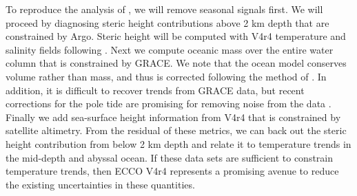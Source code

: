 \documentclass[authoryear,round,12pt]{article}
\begin{document}
To reproduce the analysis of \citet{Llovel-Willis-2014:Deep}, we will remove seasonal signals first. 
We will proceed by diagnosing steric height contributions above 2 km depth that are constrained by Argo. Steric height will be computed with V4r4 temperature and salinity fields following \citet{Piecuch-Heimbach-2015:Sensitivity}. Next we compute oceanic mass over the entire water column that is constrained by GRACE. We note that the ocean model conserves volume rather
than mass, and thus is corrected following the method of \citet{Greatbatch--1994:note}. In addition, it is difficult to recover trends from GRACE data, but recent corrections for the pole tide are promising for removing noise from the data \citep{Wahr-Nerem-2015:pole}.
Finally we add sea-surface height information from V4r4 that is constrained by satellite altimetry. From the residual of these metrics, we can back out the steric height contribution from below 2 km depth and relate it to temperature trends in the mid-depth and abyssal ocean. If these data sets are sufficient to constrain temperature trends, then ECCO V4r4 represents a promising avenue to reduce the existing uncertainties in these quantities.  





\end{document}

